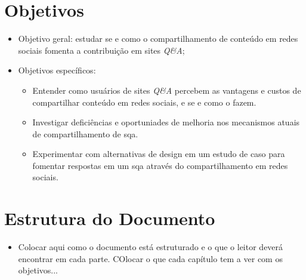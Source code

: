     \section{Objetivos}
\begin{itemize}
    \item Objetivo geral: estudar se e como o compartilhamento de conteúdo em redes sociais fomenta a contribuição em sites \textit{Q\&A};
    \item Objetivos específicos:
    \begin{itemize}
        \item Entender como usuários de sites \textit{Q\&A} percebem as vantagens e custos de compartilhar conteúdo em redes sociais, e se e como o fazem.
        \item Investigar deficiências e oportuniades de melhoria nos mecanismos atuais de compartilhamento de sqa.
        \item Experimentar com alternativas de design em um estudo de caso para fomentar respostas em um sqa através do compartilhamento em redes sociais.
        
    \end{itemize}
\end{itemize}

\section{Estrutura do Documento}
    \begin{itemize}
        \item Colocar aqui como o documento está estruturado e o que o leitor deverá encontrar em cada parte. COlocar o que cada capítulo tem a ver com os objetivos...
    \end{itemize}